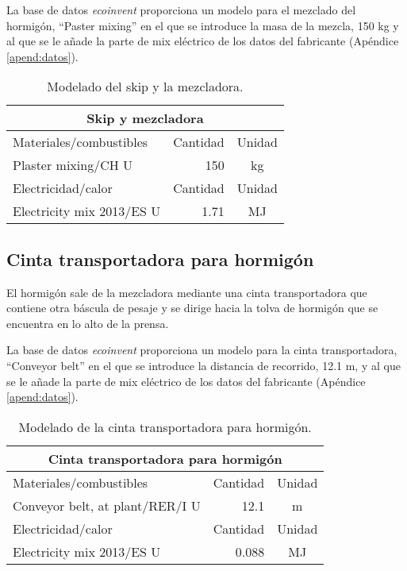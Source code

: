La base de datos \textit{ecoinvent} proporciona un modelo para el mezclado del hormigón, ``Paster mixing'' en el que se introduce la masa de la mezcla, 150 \si{kg} y al que se le añade la parte de mix eléctrico de los datos del fabricante (Apéndice \ref{apend:datos}).

\begin{table}[!htb]
\centering
\begin{tabular}{p{8cm}rc}
\toprule
\multicolumn{3}{c}{Skip y mezcladora}\\
\midrule
Materiales/combustibles & Cantidad & Unidad\\
\midrule
Plaster mixing/CH U & 150 & \si{kg}\\
\midrule
Electricidad/calor & Cantidad & Unidad\\
\midrule
Electricity mix 2013/ES U & 1.71 & \si{MJ}\\
\bottomrule
\end{tabular}
\caption{Modelado del skip y la mezcladora.}
\label{modeladoskip}
\end{table}

\subsection{Cinta transportadora para hormigón}

El hormigón sale de la mezcladora mediante una cinta transportadora que contiene otra báscula de pesaje y se dirige hacia la tolva de hormigón que se encuentra en lo alto de la prensa.

La base de datos \textit{ecoinvent} proporciona un modelo para la cinta transportadora, ``Conveyor belt'' en el que se introduce la distancia de recorrido, 12.1 \si{m}, y al que se le añade la parte de mix eléctrico de los datos del fabricante (Apéndice \ref{apend:datos}).

\begin{table}[!htb]
\centering
\begin{tabular}{p{8cm}rc}
\toprule
\multicolumn{3}{c}{Cinta transportadora para hormigón}\\
\midrule
Materiales/combustibles & Cantidad & Unidad\\
\midrule
Conveyor belt, at plant/RER/I U & 12.1 & \si{m}\\
\midrule
Electricidad/calor & Cantidad & Unidad\\
\midrule
Electricity mix 2013/ES U & 0.088 & \si{MJ}\\
\bottomrule
\end{tabular}
\caption{Modelado de la cinta transportadora para hormigón.}
\label{modeladodecintahormigon}
\end{table}


